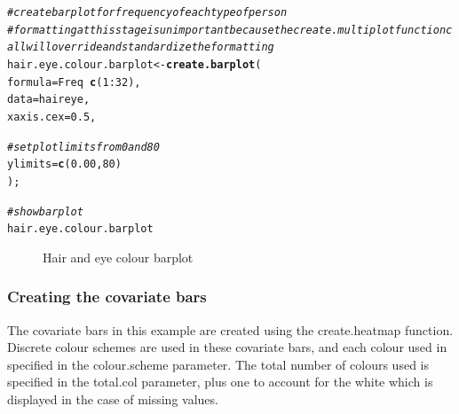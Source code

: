 \documentclass[letterpaper]{report}\usepackage[]{graphicx}\usepackage[]{color}
\makeatletter
\newcommand{\hlnum}[1]{\textcolor[rgb]{0.686,0.059,0.569}{#1}}%
\newcommand{\hlcom}[1]{\textcolor[rgb]{0.678,0.584,0.686}{\textit{#1}}}%
\newcommand{\hlopt}[1]{\textcolor[rgb]{0,0,0}{#1}}%
\newcommand{\hlstd}[1]{\textcolor[rgb]{0.345,0.345,0.345}{#1}}%
\newcommand{\hlkwb}[1]{\textcolor[rgb]{0.69,0.353,0.396}{#1}}%
\newcommand{\hlkwc}[1]{\textcolor[rgb]{0.333,0.667,0.333}{#1}}%
\newcommand{\hlkwd}[1]{\textcolor[rgb]{0.737,0.353,0.396}{\textbf{#1}}}%
\newenvironment{kframe}{%
 \def\at@end@of@kframe{}%
 \ifinner\ifhmode%
  \def\at@end@of@kframe{\end{minipage}}%
  \begin{minipage}{\columnwidth}%
 \fi\fi%
 \def\FrameCommand##1{\hskip\@totalleftmargin \hskip-\fboxsep
 \colorbox{shadecolor}{##1}\hskip-\fboxsep
     \hskip-\linewidth \hskip-\@totalleftmargin \hskip\columnwidth}%
 \MakeFramed {\advance\hsize-\width
   \@totalleftmargin\z@ \linewidth\hsize
   \@setminipage}}%
 {\par\unskip\endMakeFramed%
 \at@end@of@kframe}
\newenvironment{knitrout}{}{} %
\makeatother
\begin{document}
\begin{knitrout}
\color{fgcolor}\begin{kframe}
\begin{alltt}
\hlcom{# create barplot for frequency of each type of person}
\hlcom{# formatting at this stage is unimportant because the create.multiplot function call will override and standardize the formatting}
\hlstd{hair.eye.colour.barplot} \hlkwb{<-} \hlkwd{create.barplot}\hlstd{(}
        \hlkwc{formula} \hlstd{= Freq} \hlopt{~} \hlkwd{c}\hlstd{(}\hlnum{1}\hlopt{:}\hlnum{32}\hlstd{),}
        \hlkwc{data} \hlstd{= haireye,}
                \hlkwc{xaxis.cex} \hlstd{=} \hlnum{0.5}\hlstd{,}

        \hlcom{# set plot limits from 0 and 80 }
        \hlkwc{ylimits} \hlstd{=} \hlkwd{c}\hlstd{(}\hlnum{0.00}\hlstd{,} \hlnum{80}\hlstd{)}
        \hlstd{);}

\hlcom{# show barplot}
\hlstd{hair.eye.colour.barplot}
\end{alltt}
\end{kframe}\begin{figure}

{\centering {} 

}

\caption[Hair and eye colour barplot]{Hair and eye colour barplot\label{fig:multiplotex1_barplot}}
\end{figure}


\end{knitrout}

\subsubsection{Creating the covariate bars}
The covariate bars in this example are created using the create.heatmap function.  Discrete colour schemes are used in these covariate bars, and each colour used in specified in the colour.scheme parameter. The total number of colours used is specified in the total.col parameter, plus one to account for the white which is displayed in the case of missing values.
\end{document}
